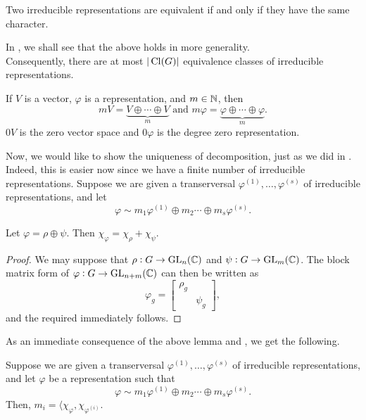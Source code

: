 		\begin{fcor}
			\label{cor: irred equivalent iff same char}
			Two irreducible representations are equivalent if and only if they have the same character.
		\end{fcor}

		In , we shall see that the above holds in more generality.\\

		Consequently, there are at most $|\operatorname{Cl}(G)|$ equivalence classes of irreducible representations.

		\begin{definition}
			If $V$ is a vector, $\varphi$ is a representation, and $m \in \mathbb{N}$, then
			\[ mV = \underbrace{V \oplus \cdots \oplus V}_{m} \text{ and } m\varphi = \underbrace{\varphi \oplus \cdots \oplus \varphi}_{m}. \]
			$0V$ is the zero vector space and $0\varphi$ is the degree zero representation.
		\end{definition}

		Now, we would like to show the uniqueness of decomposition, just as we did in . Indeed, this is easier now since we have a finite number of irreducible representations. Suppose we are given a transerversal $\varphi^{(1)},\ldots,\varphi^{(s)}$ of irreducible representations, and let
		\[ \varphi \sim m_1 \varphi^{(1)} \oplus m_2 \cdots \oplus m_s \varphi^{(s)}. \]

		\begin{lemma}
			Let $\varphi = \rho \oplus \psi$. Then $\chi_{\varphi} = \chi_\rho + \chi_\psi$.
		\end{lemma}
		\begin{proof}
			We may suppose that $\rho : G \to \operatorname{GL}_n(\mathbb{C})$ and $\psi : G \to \operatorname{GL}_m(\mathbb{C})$. The block matrix form of $\varphi : G \to \operatorname{GL}_{n+m}(\mathbb{C})$ can then be written as
			\[ \varphi_g = \begin{bmatrix} \rho_g & \\ & \psi_g \end{bmatrix}, \]
			and the required immediately follows.
		\end{proof}

		As an immediate consequence of the above lemma and , we get the following.

		\begin{ftheo}
			 Suppose we are given a transerversal $\varphi^{(1)},\ldots,\varphi^{(s)}$ of irreducible representations, and let $\varphi$ be a representation such that
			\[ \varphi \sim m_1 \varphi^{(1)} \oplus m_2 \cdots \oplus m_s \varphi^{(s)}. \]
			Then, $m_i = \langle \chi_\varphi , \chi_{\varphi^{(i)}}$.
		\end{ftheo}


